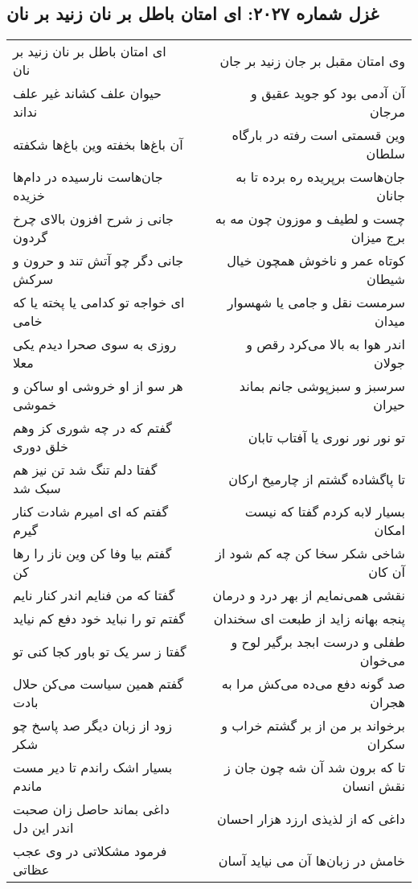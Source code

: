 \begin{center}
\section*{غزل شماره ۲۰۲۷: ای امتان باطل بر نان زنید بر نان}
\label{sec:2027}
\begin{longtable}{l p{0.5cm} r}
ای امتان باطل بر نان زنید بر نان
&&
وی امتان مقبل بر جان زنید بر جان
\\
حیوان علف کشاند غیر علف نداند
&&
آن آدمی بود کو جوید عقیق و مرجان
\\
آن باغ‌ها بخفته وین باغ‌ها شکفته
&&
وین قسمتی است رفته در بارگاه سلطان
\\
جان‌هاست نارسیده در دام‌ها خزیده
&&
جان‌هاست برپریده ره برده تا به جانان
\\
جانی ز شرح افزون بالای چرخ گردون
&&
چست و لطیف و موزون چون مه به برج میزان
\\
جانی دگر چو آتش تند و حرون و سرکش
&&
کوتاه عمر و ناخوش همچون خیال شیطان
\\
ای خواجه تو کدامی یا پخته یا که خامی
&&
سرمست نقل و جامی یا شهسوار میدان
\\
روزی به سوی صحرا دیدم یکی معلا
&&
اندر هوا به بالا می‌کرد رقص و جولان
\\
هر سو از او خروشی او ساکن و خموشی
&&
سرسبز و سبزپوشی جانم بماند حیران
\\
گفتم که در چه شوری کز وهم خلق دوری
&&
تو نور نور نوری یا آفتاب تابان
\\
گفتا دلم تنگ شد تن نیز هم سبک شد
&&
تا پاگشاده گشتم از چارمیخ ارکان
\\
گفتم که ای امیرم شادت کنار گیرم
&&
بسیار لابه کردم گفتا که نیست امکان
\\
گفتم بیا وفا کن وین ناز را رها کن
&&
شاخی شکر سخا کن چه کم شود از آن کان
\\
گفتا که من فنایم اندر کنار نایم
&&
نقشی همی‌نمایم از بهر درد و درمان
\\
گفتم تو را نباید خود دفع کم نیاید
&&
پنجه بهانه زاید از طبعت ای سخندان
\\
گفتا ز سر یک تو باور کجا کنی تو
&&
طفلی و درست ابجد برگیر لوح و می‌خوان
\\
گفتم همین سیاست می‌کن حلال بادت
&&
صد گونه دفع می‌ده می‌کش مرا به هجران
\\
زود از زبان دیگر صد پاسخ چو شکر
&&
برخواند بر من از بر گشتم خراب و سکران
\\
بسیار اشک راندم تا دیر مست ماندم
&&
تا که برون شد آن شه چون جان ز نقش انسان
\\
داغی بماند حاصل زان صحبت اندر این دل
&&
داغی که از لذیذی ارزد هزار احسان
\\
فرمود مشکلاتی در وی عجب عظاتی
&&
خامش در زبان‌ها آن می نیاید آسان
\\
\end{longtable}
\end{center}
